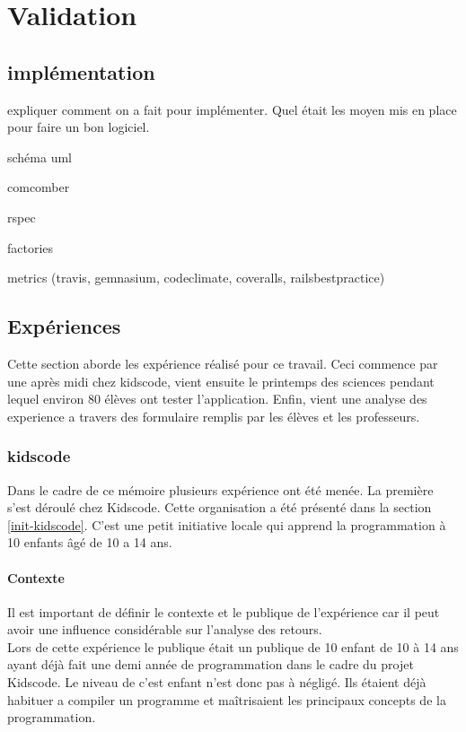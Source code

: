 \chapter{Validation}
\section{implémentation}
expliquer comment on a fait pour implémenter. Quel était les moyen mis en place pour faire un bon logiciel.

schéma uml

comcomber

rspec

factories

metrics (travis, gemnasium, codeclimate, coveralls, railsbestpractice)

\section{Expériences}
Cette section aborde les expérience réalisé pour ce travail. Ceci commence par une après midi chez kidscode, vient ensuite le printemps des sciences pendant lequel environ 80 élèves ont tester l'application. Enfin, vient une analyse des experience a travers des formulaire remplis par les élèves et les professeurs.
\subsection{kidscode}
\label{kidscode}
Dans le cadre de ce mémoire plusieurs expérience ont été menée. La première s'est déroulé chez Kidscode. Cette organisation a été présenté dans la section \ref{init-kidscode}. C'est une petit initiative locale qui apprend la programmation à 10 enfants âgé de 10 a 14 ans.

\subsubsection{Contexte}
\label{context-kidscode}
Il est important de définir le contexte et le publique de l'expérience car il peut avoir une influence considérable sur l'analyse des retours.\\

Lors de cette expérience le publique était un publique de 10 enfant de 10 à 14 ans ayant déjà fait une demi année de programmation dans le cadre du projet Kidscode. Le niveau de c'est enfant n'est donc pas à négligé. Ils étaient déjà habituer a compiler un programme et maîtrisaient les principaux concepts de la programmation.\\

